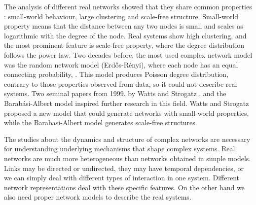 The analysis of different real networks showed that they share common properties \cite{boccaletti2006complex}: small-world behaviour, large clustering and scale-free structure. Small-world property means that the distance between any two nodes is small and scales as logarithmic with the degree of the node. Real systems show high clustering, and the most prominent feature is scale-free property, where the degree distribution follows the power law. Two decades before, the most used complex network model was the random network model (Erdős-Rényi), where each node has an equal connecting probability, \cite{dorogovtsev2010complex}. This model produces Poisson degree distribution, contrary to those properties observed from data, so it could not describe real systems. Two seminal papers from 1999. by Watts and Strogatz \cite{watts1998collective}, and the Barabási-Albert model \cite{barabasi1999} inspired further research in this field. Watts and Strogatz  \cite{watts1998collective} proposed a new model that could generate networks with small-world properties, while the Barabasi-Albert model generates scale-free structures. 

The studies about the dynamics and structure of complex networks are necessary for understanding underlying mechanisms that shape complex systems. Real networks are much more heterogeneous than networks obtained in simple models. Links may be directed or undirected, they may have temporal dependencies, or we can simply deal with different types of interaction in one system. Different network representations deal with these specific features. On the other hand we also need proper network models to describe the real systems. 


